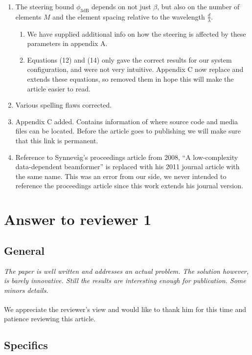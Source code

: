 \documentclass[11pt]{article} %
\newcommand\1{\vec 1}
\newcommand\q[1]{\textit{#1}}
\newcommand\ans[1]{#1}
\begin{document}
\begin{enumerate}
\item The steering bound $\phi_\mathrm{3dB}$ depends on not just $\beta$, but also on the number of elements $M$ and the element spacing relative to the wavelength $\frac{d}{\lambda}$. 
\begin{enumerate}
\item We have supplied additional info on how the steering is affected by these parameters in appendix A.
\item Equations (12) and (14) only gave the correct results for our system configuration, and were not very intuitive. Appendix C now replace and extends these equations, so removed them in hope this will make the article easier to read.
\end{enumerate}
\item Various spelling flaws corrected.
\item Appendix C added. Contains information of where source code and media files can be located. Before the article goes to publishing we will make sure that this link is permanent.
\item Reference to Synnevåg's proceedings article from 2008, ``A low-complexity data-dependent beamformer'' is replaced with his 2011 journal article with the same name. This was an error from our side, we never intended to reference the proceedings article since this work extends his journal version.
\end{enumerate}


\newpage
\section{Answer to reviewer 1}

\subsection*{General}

\q{The paper is well written and addresses an actual problem. The solution however, is barely innovative. Still the results are interesting enough for publication. Some minors details.} \\\\
\ans{We appreciate the reviewer's view and would like to thank him for this time and patience reviewing this article.}

\subsection*{Specifics}
\end{document}
